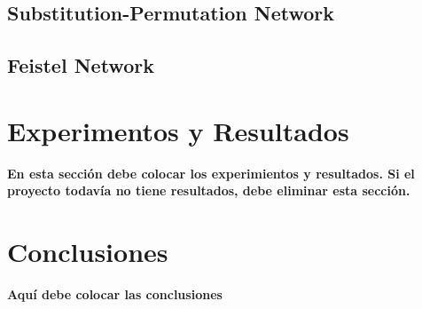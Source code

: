 \documentclass[conference]{IEEEtran}
\begin{document}
\subsection{Substitution-Permutation Network}
\subsection{Feistel Network}

\section{Experimentos y Resultados} \label{experimentos}
\textbf{En esta sección debe colocar los experimientos y resultados. Si el proyecto todavía no tiene resultados, debe eliminar esta sección.}

\section{Conclusiones}
\textbf{Aquí debe colocar las conclusiones}



\vspace{12pt}
\end{document}

